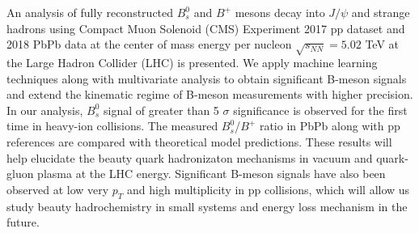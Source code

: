 % 
% 
%
An analysis of fully reconstructed $B^0_s$ and $B^+$ mesons decay into $J/\psi$ and strange hadrons using Compact Muon Solenoid (CMS) Experiment 2017 pp dataset and 2018 PbPb data at the center of mass energy per nucleon $\sqrt{s_{NN}} = 5.02$ TeV at the Large Hadron Collider (LHC) is presented. We apply machine learning techniques along with multivariate analysis to obtain significant B-meson signals and extend the kinematic regime of B-meson measurements with higher precision. In our analysis, $B^0_s$ signal of greater than 5 $\sigma$ significance is observed for the first time in heavy-ion collisions. The measured $B^0_s$/$B^+$ ratio in PbPb along with pp references are compared with theoretical model predictions. These results will help elucidate the beauty quark hadronizaton mechanisms in vacuum and quark-gluon plasma at the LHC energy. Significant B-meson signals have also been observed at low very $p_T$ and high multiplicity in pp collisions, which will allow us study beauty hadrochemistry in small systems and energy loss mechanism in the future. 